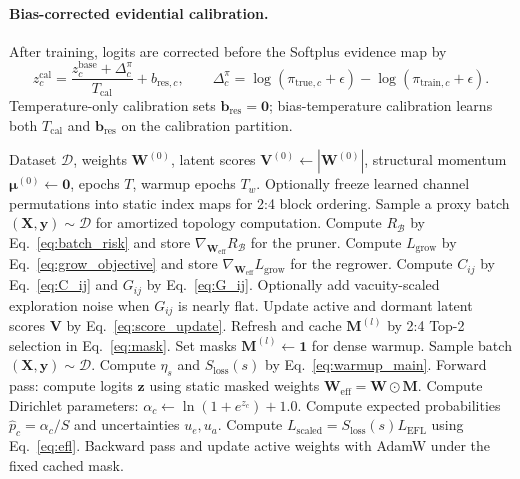 \documentclass[letterpaper]{article} %
\begin{document}
\paragraph{Bias-corrected evidential calibration.}
After training, logits are corrected before the Softplus evidence map by
\begin{equation}
    z^{\mathrm{cal}}_c
    =
    \frac{z^{\mathrm{base}}_c+\Delta^\pi_c}{T_{\mathrm{cal}}}
    + b_{\mathrm{res},c},
    \qquad
    \Delta^\pi_c=\log(\pi_{\mathrm{true},c}+\epsilon)-\log(\pi_{\mathrm{train},c}+\epsilon).
\end{equation}
Temperature-only calibration sets $\bm{b}_{\mathrm{res}}=\bm{0}$; bias-temperature calibration learns both $T_{\mathrm{cal}}$ and $\bm{b}_{\mathrm{res}}$ on the calibration partition.

\begin{algorithm}[H]
\caption{GUDS-EDL Training and Optimization Loop}
\label{alg:guds_edl}
\begin{algorithmic}[1]
\REQUIRE Dataset $\mathcal{D}$, weights $\bm{W}^{(0)}$, latent scores $\bm{V}^{(0)}\leftarrow|\bm{W}^{(0)}|$, structural momentum $\bm{\mu}^{(0)}\leftarrow\bm{0}$, epochs $T$, warmup epochs $T_w$.
        \STATE Optionally freeze learned channel permutations into static index maps for 2:4 block ordering.
    \ENDIF
        \STATE Sample a proxy batch $(\bm{X}, \bm{y}) \sim \mathcal{D}$ for amortized topology computation.
        \STATE Compute $R_{\mathcal B}$ by Eq.~\ref{eq:batch_risk} and store $\nabla_{\bm{W}_{\text{eff}}}R_{\mathcal B}$ for the pruner.
        \STATE Compute $L_{\text{grow}}$ by Eq.~\ref{eq:grow_objective} and store $\nabla_{\bm{W}_{\text{eff}}}L_{\text{grow}}$ for the regrower.
        \STATE Compute $C_{ij}$ by Eq.~\ref{eq:C_ij} and $G_{ij}$ by Eq.~\ref{eq:G_ij}.
        \STATE Optionally add vacuity-scaled exploration noise when $G_{ij}$ is nearly flat.
        \STATE Update active and dormant latent scores $\bm{V}$ by Eq.~\ref{eq:score_update}.
        \STATE Refresh and cache $\bm{M}^{(l)}$ by 2:4 Top-2 selection in Eq.~\ref{eq:mask}.
    \ELSE
        \STATE Set masks $\bm{M}^{(l)}\leftarrow\mathbf{1}$ for dense warmup.
    \ENDIF
        \STATE Sample batch $(\bm{X}, \bm{y}) \sim \mathcal{D}$.
        \STATE Compute $\eta_s$ and $S_{\text{loss}}(s)$ by Eq.~\ref{eq:warmup_main}.
        \STATE Forward pass: compute logits $\bm{z}$ using static masked weights $\bm{W}_{\text{eff}} = \bm{W} \odot \bm{M}$.
        \STATE Compute Dirichlet parameters: $\alpha_c \leftarrow \ln(1 + e^{z_c}) + 1.0$.
        \STATE Compute expected probabilities $\hat{p}_c = \alpha_c/S$ and uncertainties $u_e, u_a$.
        \STATE Compute $L_{\text{scaled}}=S_{\text{loss}}(s)L_{\text{EFL}}$ using Eq.~\ref{eq:efl}.
        \STATE Backward pass and update active weights with AdamW under the fixed cached mask.
    \ENDFOR
\ENDFOR
\end{algorithmic}
\end{algorithm}
\end{document}
